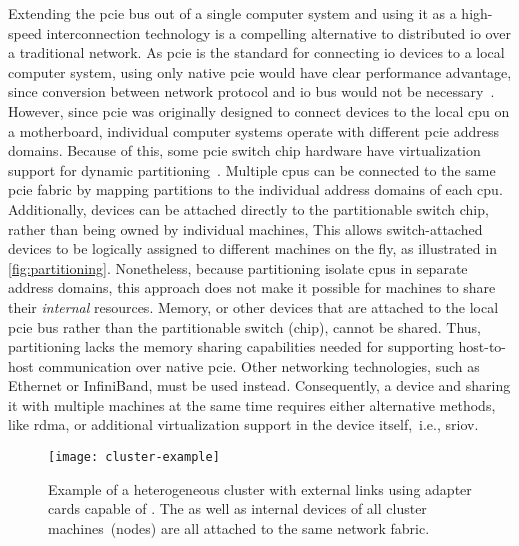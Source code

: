 Extending the \gls{pcie} bus out of a single computer system and using it as a high-speed interconnection technology is a compelling alternative to distributed \gls{io} over a traditional network.
%
As \gls{pcie} is the standard for connecting \gls{io} devices to a local computer system, using only native \gls{pcie} would have clear performance advantage, since conversion between network protocol and \gls{io} bus would not be necessary~\cite{Fountain2005,Ravindran2008,whitepaper:Regula2004}.
%
However, since \gls{pcie} was originally designed to connect devices to the local \gls{cpu} on a motherboard, individual computer systems operate with different \gls{pcie} address domains.
%
Because of this, some \gls{pcie} switch chip hardware have virtualization support for dynamic partitioning~\cite{Chung2018,whitepaper:IDT,whitepaper:Microsemi,url:rackscale,url:liqid,url:gigaio}. 
%
Multiple \glspl{cpu} can be connected to the same \gls{pcie} fabric by mapping partitions to the individual address domains of each \gls{cpu}.
%
Additionally, devices can be attached directly to the partitionable switch chip, rather than being owned by individual machines, 
%
This allows switch-attached devices to be logically assigned to different machines on the fly, as illustrated in \cref{fig:partitioning}.
%
Nonetheless, because partitioning isolate \glspl{cpu} in separate address domains, this approach does not make it possible for machines to share their \emph{internal} resources.
%
Memory, or other devices that are attached to the local \gls{pcie} bus rather than the partitionable switch (chip), cannot be shared.
%
Thus, partitioning lacks the memory sharing capabilities needed for supporting host-to-host communication over native \gls{pcie}.
%
Other networking technologies, such as Ethernet or InfiniBand, must be used instead.
%
Consequently,  a device and sharing it with multiple machines at the same time requires either alternative methods, like \gls{rdma}, or additional virtualization support in the device itself,~i.e., \gls{sriov}.




\begin{figure}[!h]
	\centering
    \texttt{[image: cluster-example]}
    \caption[Example of a heterogeneous -networked cluster with  adapter cards and external cables]{Example of a heterogeneous  cluster with external  links using adapter cards capable of . The  as well as internal devices of all cluster machines~(nodes) are all attached to the same  network fabric.}
  	\label{fig:cluster-example}
\end{figure}



